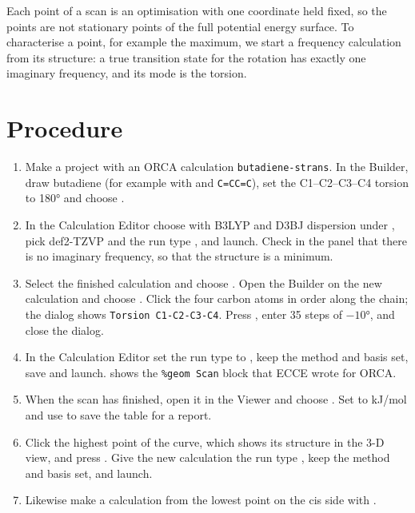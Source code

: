 Each point of a scan is an optimisation with one coordinate held fixed, so the points are not stationary points of the full potential energy surface. To characterise a point, for example the maximum, we start a frequency calculation from its structure: a true transition state for the rotation has exactly one imaginary frequency, and its mode is the torsion.

\section{Procedure}
\begin{enumerate}
	\item Make a project with an ORCA calculation \texttt{butadiene-strans}. In the Builder, draw butadiene (for example with  and \texttt{C=CC=C}), set the C1--C2--C3--C4 torsion to 180° and choose .
	\item In the Calculation Editor choose  with B3LYP and D3BJ dispersion under , pick def2-TZVP and the run type , and launch. Check in the  panel that there is no imaginary frequency, so that the structure is a minimum.
	\item Select the finished calculation and choose . Open the Builder on the new calculation and choose . Click the four carbon atoms in order along the chain; the dialog shows \texttt{Torsion C1-C2-C3-C4}. Press , enter 35 steps of $-10$°, and close the dialog.
	\item In the Calculation Editor set the run type to , keep the method and basis set, save and launch.  shows the \texttt{\%geom Scan} block that ECCE wrote for ORCA.
	\item When the scan has finished, open it in the Viewer and choose . Set  to kJ/mol and use  to save the table for a report.
	\item Click the highest point of the curve, which shows its structure in the 3-D view, and press . Give the new calculation the run type , keep the method and basis set, and launch.
	\item Likewise make a  calculation from the lowest point on the cis side with .
\end{enumerate}

